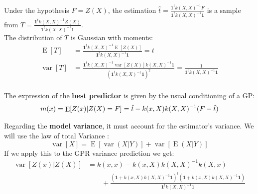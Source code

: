 \documentclass{beamer}
\DeclareMathOperator*{\Var}{var}
\DeclareMathOperator*{\E}{E}
\begin{document}
\begin{frame}{}
Under the hypothesis $F=Z(X)$, the estimation $ \displaystyle \hat{t} = \frac{\mathbf{1}^t k(X,X)^{-1} F}{\mathbf{1}^t k(X,X)^{-1} \mathbf{1}}$ is a sample from $ \displaystyle T = \frac{\mathbf{1}^t k(X,X)^{-1} Z(X)}{\mathbf{1}^t k(X,X)^{-1} \mathbf{1}}$. \\ \vspace{5mm}
The distribution of $T$ is Gaussian with moments:
\begin{equation*}
\begin{split}
	\E[T] & = \frac{\mathbf{1}^t k(X,X)^{-1} \E[Z(X)]}{\mathbf{1}^t k(X,X)^{-1} \mathbf{1}} = t\\
	\Var[T] & = \frac{\mathbf{1}^t k(X,X)^{-1} \Var[Z(X)] k(X,X)^{-1} \mathbf{1}}{(\mathbf{1}^t k(X,X)^{-1} \mathbf{1})^2} = \frac{1}{\mathbf{1}^t k(X,X)^{-1} \mathbf{1}}\\
\end{split}
\end{equation*}
\end{frame}

\begin{frame}{}
The expression of the \textbf{best predictor} is given by the usual conditioning of a GP:
\begin{equation*}
m(x) = \E[Z(x)|Z(X)=F] = \hat{t} - k(x,X) k(X,X)^{-1} (F - \hat{t}) \vspace{5mm}
\end{equation*} 

Regarding the \textbf{model variance}, it must account for the estimator's variance. We will use the law of total Variance :
\begin{equation*}
\Var[X] = \E[\Var(X|Y)] + \Var[\E(X|Y)]
\end{equation*} 
If we apply this to the GPR variance prediction we get:
\small
\begin{equation*}
\begin{split}
\Var[Z(x)|Z(X)] &=  k(x,x) - k(x,X) k(X,X)^{-1} k(X,x)   \\
& \qquad + \frac{(\mathbf{1} + k(x,X)k(X,X)^{-1}\mathbf{1})^t(\mathbf{1} + k(x,X)k(X,X)^{-1}\mathbf{1})}{\mathbf{1}^t k(X,X)^{-1} \mathbf{1}} \\
\end{split}
\end{equation*} 
\normalsize
\end{frame}
\end{document}
